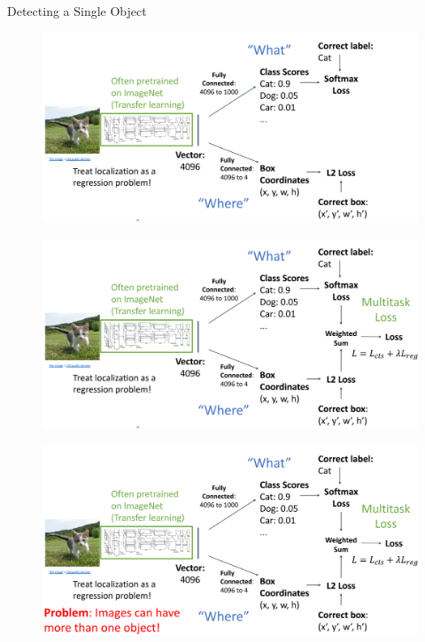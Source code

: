 \begin{frame}[allowframebreaks]{Detecting a Single Object}
    \begin{figure}
        \centering
        \includegraphics[width=1.0\textwidth,height=1.0\textheight,keepaspectratio]{images/object-detect/object_5.png}
    \end{figure}

\framebreak

    \begin{figure}
        \centering
        \includegraphics[width=1.0\textwidth,height=1.0\textheight,keepaspectratio]{images/object-detect/object_6.png}
    \end{figure}

\framebreak

    \begin{figure}
        \centering
        \includegraphics[width=1.0\textwidth,height=1.0\textheight,keepaspectratio]{images/object-detect/object_7.png}
    \end{figure}
    
\end{frame}


